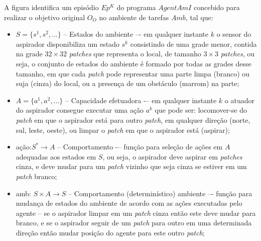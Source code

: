 \begin{figure}[h!]
    \centering
\end{figure}

A figura identifica um episódio $Ep^K$ do programa $AgentAmI$ concebido para realizar o objetivo original $O_O$ no ambiente de tarefas $Amb$, tal que:

\begin{itemize}
    \item $S = \{s^1, s^2, \ldots \}$ -- Estados do ambiente –- em qualquer instante $k$ o sensor do aspirador disponibiliza um estado $s^k$ consistindo de uma grade menor, contida na grade $32\times32$ \textit{patches} que representa o local, de tamanho $3\times3$ \textit{patches}, ou seja, o conjunto de estados do ambiente é formado por todas as grades desse tamanho, em que cada \textit{patch} pode representar uma parte limpa (branco) ou suja (cinza) do local, ou a presença de um obstáculo (marrom) na parte;
    
    \item $A = \{a^1, a^2, \ldots \}$ -- Capacidade efetuadora -– em qualquer instante $k$ o atuador do aspirador consegue executar uma ação $a^k$ que pode ser: locomover-se do \textit{patch} em que o aspirador está para outro \textit{patch}, em qualquer direção (norte, sul, leste, oeste), ou limpar o \textit{patch} em que o aspirador está (aspirar);   
    
    \item ação:$S^*  \rightarrow A $ -- Comportamento -– função para seleção de ações em $A$ adequadas aos estados em $S$, ou seja, o aspirador deve aspirar em \textit{patches} cinza, e deve mudar para um \textit{patch} vizinho que seja cinza se estiver em um \textit{patch} branco;
    
    \item amb: $S\times A \rightarrow S$ -- Comportamento (determinístico) ambiente –- função para mudança de estados do ambiente de acordo com as ações executadas pelo agente – se o aspirador limpar em um \textit{patch} cinza então este deve mudar para branco, e se o aspirador seguir de um \textit{patch} para outro em uma determinada direção então mudar posição do agente para este outro \textit{patch}; 
    

\end{itemize}
